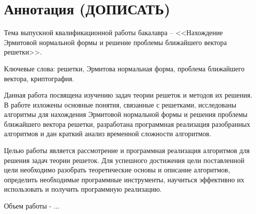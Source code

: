 \newpage
\setcounter{page}{2}

\section*{Аннотация (ДОПИСАТЬ)}

Тема выпускной квалификационной работы бакалавра -- <<Нахождение Эрмитовой нормальной формы и решение проблемы ближайшего вектора решетки>>.

Ключевые слова: решетки, Эрмитова нормальная форма, проблема ближайшего вектора, криптография.

Данная работа посвящена изучению задач теории решеток и методов их решения. В работе изложены основные понятия, связанные с решетками, исследованы алгоритмы для нахождения Эрмитовой нормальной формы и решения проблемы ближайшего вектора решетки, разработана программная реализация разобранных алгоритмов и дан краткий анализ временной сложности алгоритмов.

Целью работы является рассмотрение и программная реализация алгоритмов для решения задач теории решеток. Для успешного достижения цели поставленной цели необходимо разобрать теоретические основы и описание алгоритмов, определить необходимые программные инструменты,  научиться эффективно их использовать и получить программную реализацию.

Объем работы - ...

\clearpage